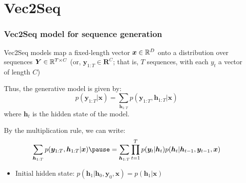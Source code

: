 \documentclass[smaller]{beamer}
\begin{document}
\section{Vec2Seq}
\begin{frame}
  \frametitle{Vec2Seq model for sequence generation}
  \pe
  Vec2Seq models map a fixed-length vector $\bm x\in\mathbb R^D$ onto a distribution over sequences $\bm Y\in \mathbb R^{T\times C}$ (or, $\bm y_{1:T}\in \bm R^{C}$; that is, $T$ sequences, with each $y_t$ a vector of length $C$)\pe

  \medskip
  Thus, the generative model is given by:
  \begin{equation}
    p(\bm y_{1:T}|\bm x) = \sum _{\bm h_{1:T}}p(\bm y_{1:T}, \bm h_{1:T}|\bm x)
  \end{equation}\pe
  where  $\bm h_{t}$ is the hidden state of the model.\pe

  By the multiplication rule, we can write:\pe
  \begin{equation}
    \sum _{\bm h_{1:T}}p(\bm y_{1:T}, \bm h_{1:T}|\bm x) \pe =
    \sum_{\bm h_{1:T}}\prod_{t=1}^{T} p(\bm y_{t}|\bm h_{t})p(\bm h_{t}|\bm h_{t-1}, \bm y_{t-1}, \bm x)
  \end{equation}
  \begin{itemize}
  \item Initial hidden state: \pe $p(\bm h_{1}|\bm h_{0},\bm y_{0},\bm x) = p(\bm h_{1}|\bm x)$\pe
  \end{itemize}
\end{frame}
\end{document}
